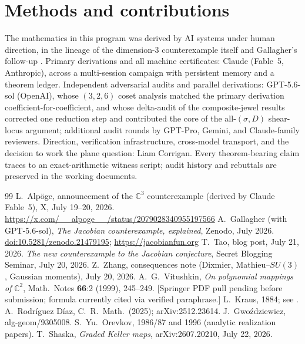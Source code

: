 \documentclass[11pt]{article}
\newcommand{\C}{\mathbb{C}}
\begin{document}
\section{Methods and contributions}

The mathematics in this program was derived by AI systems under human
direction, in the lineage of the dimension-3 counterexample itself
\cite{Alpoge2026} and Gallagher's follow-up \cite{Gallagher2026}. Primary
derivations and all machine certificates: Claude (Fable~5, Anthropic),
across a multi-session campaign with persistent memory and a theorem
ledger. Independent adversarial audits and parallel derivations:
GPT-5.6-sol (OpenAI), whose $(3,2,6)$ coset analysis matched the primary
derivation coefficient-for-coefficient, and whose delta-audit of the
composite-jewel results corrected one reduction step and contributed the
core of the all-$(\sigma,D)$ shear-locus argument; additional audit rounds
by GPT-Pro, Gemini, and Claude-family reviewers. Direction, verification
infrastructure, cross-model transport, and the decision to work the plane
question: Liam Corrigan. Every theorem-bearing claim traces to an
exact-arithmetic witness script; audit history and rebuttals are preserved
in the working documents.

\begin{thebibliography}{99}\footnotesize
{} L.~Alp\"oge, announcement of the $\C^3$ counterexample
(derived by Claude Fable~5), X, July 19--20, 2026.
\url{https://x.com/__alpoge__/status/2079028340955197566}
 A.~Gallagher (with GPT-5.6-sol), \emph{The Jacobian
counterexample, explained}, Zenodo, July 2026.
\href{https://doi.org/10.5281/zenodo.21479195}{doi:10.5281/zenodo.21479195};
\url{https://jacobianfun.org}
 T.~Tao, blog post, July 21, 2026.
 \emph{The new counterexample to the Jacobian conjecture},
Secret Blogging Seminar, July 20, 2026.
 Z.~Zhang, consequences note (Dixmier,
Mathieu--$SU(3)$, Gaussian moments), July 20, 2026.
 A.~G.~Vitushkin, \emph{On polynomial mappings of}
$\C^2$, Math.\ Notes \textbf{66}:2 (1999), 245--249. [Springer PDF pull
pending before submission; formula currently cited via verified paraphrase.]
 L.~Kraus, 1884; see \cite{RD2025}.
 A.~Rodr\'iguez D\'iaz, C.\ R.\ Math.\ (2025);
arXiv:2512.23614.
 J.~Gwo\'zdziewicz, alg-geom/9305008.
 S.~Yu.~Orevkov, 1986/87 and 1996 (analytic realization
papers).
 T.~Shaska, \emph{Graded Keller maps},
arXiv:2607.20210, July 22, 2026.
\end{thebibliography}
\end{document}
